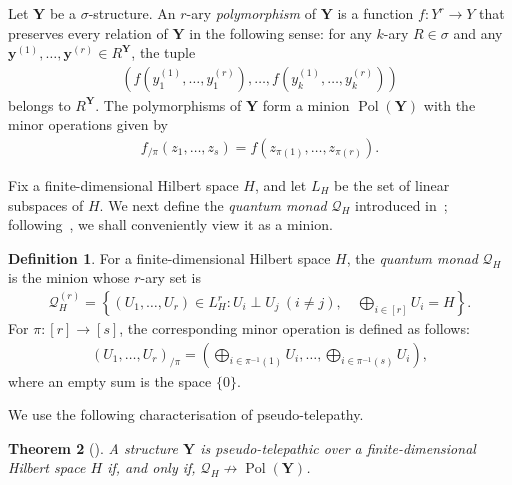 \documentclass[11pt]{article}
\newcommand{\Y}{\mathbf Y}
\DeclareMathOperator{\Pol}{Pol}
\newcommand{\minion}[1]{{\mathcal #1}}
\theoremstyle{plain}
\newtheorem{theorem}{Theorem}
\theoremstyle{definition}
\newtheorem{definition}[theorem]{Definition}
\theoremstyle{remark}
\begin{document}
Let $\Y$ be a $\sigma$-structure. 
An $r$-ary \emph{polymorphism} of $\Y$ is a function $f:Y^r\to Y$
that preserves every relation of $\Y$ in the following sense: for any $k$-ary $R\in\sigma$
and any $\mathbf y^{(1)},\ldots,\mathbf y^{(r)}\in R^{\Y}$, the tuple
\begin{align*}
 (f(y_1^{(1)},\dots,y_1^{(r)}),\dots,
       f(y_k^{(1)},\dots, y_k^{(r)}))
\end{align*}
belongs to $R^{\Y}$. The polymorphisms of $\Y$ form a minion $\Pol(\Y)$ with the minor operations given by
\begin{align*}
 f_{/\pi}(z_1,\dots,z_s)
   =f(z_{\pi(1)},\dots,z_{\pi(r)}).
\end{align*}


Fix a finite-dimensional Hilbert space $H$, and let $L_H$ be the set of linear subspaces of $H$.
We next define the \textit{quantum monad} $\minion Q_H$ introduced in~\cite{abramsky2017quantum}; following~\cite{ciardo_quantum_minion}, we shall conveniently view it as a minion.

\begin{definition}
For a finite-dimensional Hilbert space $H$, the \emph{quantum monad} $\minion Q_H$ is the minion whose $r$-ary set is
\begin{align*}
 \minion Q_H^{(r)}=
 \left\{(U_1,\dots,U_r)\in L_H^r:
    U_i\perp U_j\ (i\ne j),\quad \bigoplus_{i\in[r]}U_i=H\right\}.
\end{align*}
For $\pi:[r]\to[s]$, the corresponding minor operation is defined as follows:
\begin{align*}
 (U_1,\ldots,U_r)_{/\pi}
   =\left(\bigoplus_{i\in\pi^{-1}(1)}U_i,\dots,
           \bigoplus_{i\in\pi^{-1}(s)}U_i\right),
\end{align*}
where an empty sum is the space $\{0\}$.
\end{definition}



We use the following characterisation of pseudo-telepathy.

\begin{theorem}[{\cite[Theorem~6]{ciardo_quantum_minion}}]
\label{thm_characterisation_PT}
A structure $\Y$ is pseudo-telepathic over a finite-dimensional Hilbert space
$H$ if, and only if,
$\minion Q_H\not\to\Pol(\Y)$.
\end{theorem}
\end{document}
